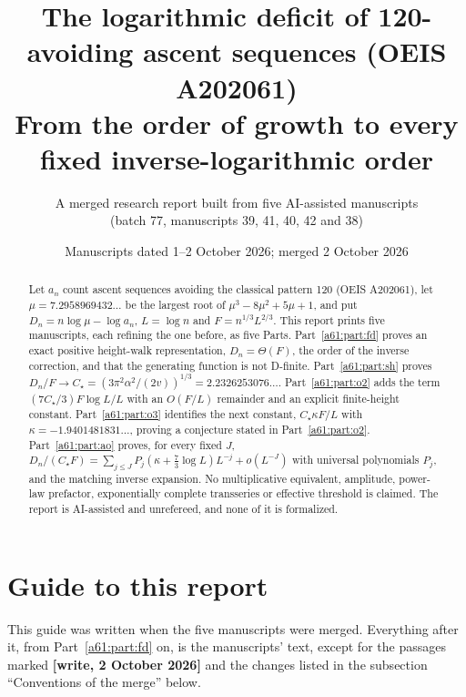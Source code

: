 \documentclass[11pt,letterpaper]{article}
\title{The logarithmic deficit of 120-avoiding ascent sequences (OEIS A202061)\\[4pt]
\large From the order of growth to every fixed inverse-logarithmic order}
\author{A merged research report built from five AI-assisted manuscripts\\
(batch 77, manuscripts 39, 41, 40, 42 and 38)}
\date{Manuscripts dated 1--2 October 2026; merged 2 October 2026}
\numberwithin{equation}{section}
\theoremstyle{remark}\newtheorem{remark}[theorem]{Remark}
\begin{document}
\maketitle
\begin{abstract}
Let $a_n$ count ascent sequences avoiding the classical pattern 120 (OEIS A202061), let $\mu=7.2958969432\ldots$ be the largest root of $\mu^3-8\mu^2+5\mu+1$, and put $D_n=n\log\mu-\log a_n$, $L=\log n$ and $F=n^{1/3}L^{2/3}$. This report prints five manuscripts, each refining the one before, as five Parts. Part~\ref{a61:part:fd} proves an exact positive height-walk representation, $D_n=\Theta(F)$, the order of the inverse correction, and that the generating function is not D-finite. Part~\ref{a61:part:sh} proves $D_n/F\to C_\star=(3\pi^2\alpha^2/(2v))^{1/3}=2.2326253076\ldots$. Part~\ref{a61:part:o2} adds the term $(7C_\star/3)F\log L/L$ with an $O(F/L)$ remainder and an explicit finite-height constant. Part~\ref{a61:part:o3} identifies the next constant, $C_\star\kappa F/L$ with $\kappa=-1.9401481831\ldots$, proving a conjecture stated in Part~\ref{a61:part:o2}. Part~\ref{a61:part:ao} proves, for every fixed $J$, $D_n/(C_\star F)=\sum_{j\le J}P_j(\kappa+\tfrac73\log L)L^{-j}+o(L^{-J})$ with universal polynomials $P_j$, and the matching inverse expansion. No multiplicative equivalent, amplitude, power-law prefactor, exponentially complete transseries or effective threshold is claimed. The report is AI-assisted and unrefereed, and none of it is formalized.
\end{abstract}
\setcounter{tocdepth}{2}
\tableofcontents

\section*{Guide to this report}
\label{a61:guide}
This guide was written when the five manuscripts were merged. Everything after it, from Part~\ref{a61:part:fd} on, is the manuscripts' text, except for the passages marked \textbf{[write, 2 October 2026]} and the changes listed in the subsection ``Conventions of the merge'' below.
\end{document}
